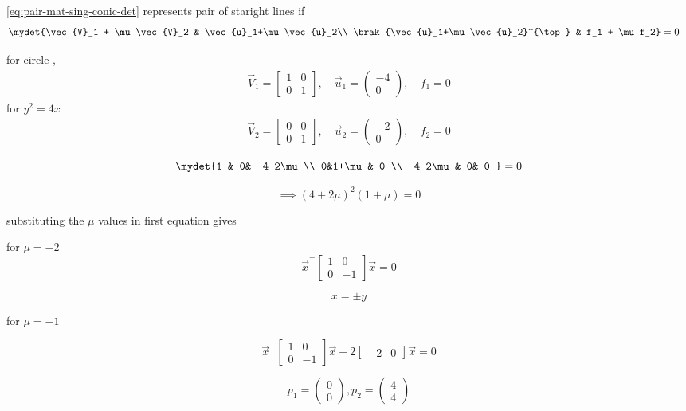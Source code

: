 \begin{enumerate}[label=\thesubsection.\arabic*, ref=\thesubsection.\theenumi]
\eqref{eq:pair-mat-sing-conic-det} represents pair of staright lines if 
\begin{align}	
	\mydet{\vec{V}_1 + \mu\vec{V}_2 & \vec{u}_1+\mu \vec{u}_2\\ \brak{\vec{u}_1+\mu \vec{u}_2}^{\top} & f_1 + \mu f_2} &= 0
\end{align}

for circle ,
\begin{align}
	 \vec{V}_1 = \begin{bmatrix} 1 & 0 \\ 0 & 1 \end{bmatrix}, \quad
	\vec{u}_1 = \begin{pmatrix} -4 \\ 0 \end{pmatrix}, \quad
	f_1 = 0
\end{align}
for $y^2 = 4x$
\begin{align}
	\vec{V}_2 = \begin{bmatrix} 0 & 0 \\ 0 & 1 \end{bmatrix}, \quad
	\vec{u}_2 = \begin{pmatrix} -2 \\ 0 \end{pmatrix}, \quad
	f_2 = 0
\end{align}

$$\mydet{1 & 0& -4-2\mu \\ 0&1+\mu& 0 \\ -4-2\mu & 0& 0 }=0$$

$$\implies (4+2\mu)^2(1+\mu)=0$$

substituting the $\mu$ values in first equation gives 

for $\mu = -2$
$$
	\vec{x}^{\top}\begin{bmatrix} 1&0\\ 0 & -1 \end{bmatrix} \vec{x} =0 
$$

$$ x = \pm y$$

for $\mu = -1$

$$
\vec{x}^{\top}\begin{bmatrix} 1&0\\ 0 & -1 \end{bmatrix} \vec{x} + 2 \begin{bmatrix} -2 & 0 \end{bmatrix} \vec{x} =0 
$$

$$ p_1= \begin{pmatrix} 0\\0\end{pmatrix} ,p_2 = \begin{pmatrix} 4\\4 \end{pmatrix} $$





\end{enumerate}
